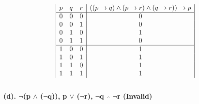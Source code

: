 \documentclass[a4paper]{article}
\begin{document}
\begin{displaymath}
    \begin{array}{|c c c|c|}
        p & q & r & ((p \rightarrow q) \wedge (p \rightarrow r) \wedge (q \rightarrow r)) \rightarrow p \\
        \hline
        0 & 0 & 0 & 0                                                                                   \\
        0 & 0 & 1 & 0                                                                                   \\
        0 & 1 & 0 & 1                                                                                   \\
        0 & 1 & 1 & 0                                                                                   \\
        \hline
        1 & 0 & 0 & 1                                                                                   \\
        1 & 0 & 1 & 1                                                                                   \\
        1 & 1 & 0 & 1                                                                                   \\
        1 & 1 & 1 & 1                                                                                   \\
    \end{array}
\end{displaymath}
\ \\
\textbf{(d). $\neg $(p $\wedge $ ($\neg $q)), p $\vee $ ($\neg $r), $\neg $q $\therefore $ $\neg $r (Invalid)}\\
\end{document}
